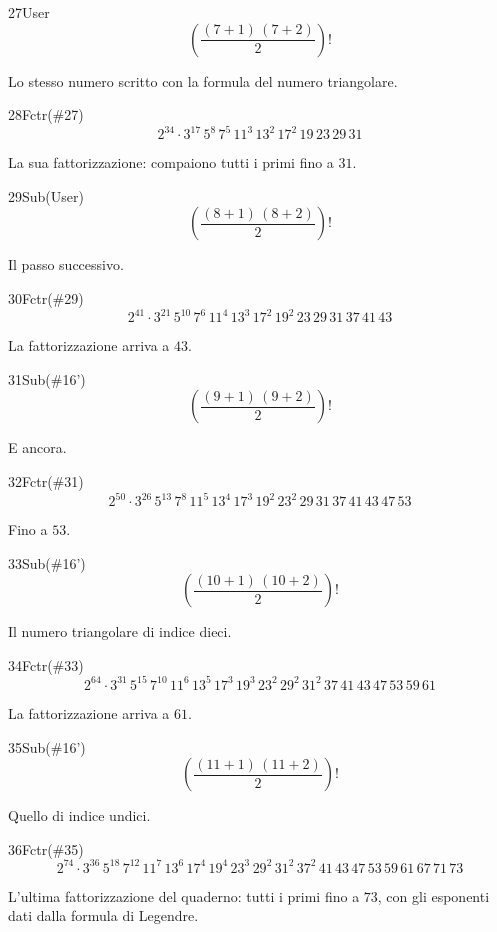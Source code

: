 \begin{espr}{27}{User}{}
\[
\left(\frac{\left(7 + 1\right)\, \left(7 + 2\right)}{2}\right)!
\]
\end{espr}
Lo stesso numero scritto con la formula del numero triangolare.

\begin{espr}{28}{Fctr(\#27)}{}
\[
2^{34} \cdot 3^{17}\, 5^{8}\, 7^{5}\, 11^{3}\, 13^{2}\, 17^{2}\, 19\, 23\, 29\, 31
\]
\end{espr}
La sua fattorizzazione: compaiono tutti i primi fino a $31$.

\begin{espr}{29}{Sub(User)}{}
\[
\left(\frac{\left(8 + 1\right)\, \left(8 + 2\right)}{2}\right)!
\]
\end{espr}
Il passo successivo.

\begin{espr}{30}{Fctr(\#29)}{}
\[
2^{41} \cdot 3^{21}\, 5^{10}\, 7^{6}\, 11^{4}\, 13^{3}\, 17^{2}\, 19^{2}\, 23\, 29\, 31\, 37\, 41\, 43
\]
\end{espr}
La fattorizzazione arriva a $43$.

\begin{espr}{31}{Sub(\#16')}{}
\[
\left(\frac{\left(9 + 1\right)\, \left(9 + 2\right)}{2}\right)!
\]
\end{espr}
E ancora.

\begin{espr}{32}{Fctr(\#31)}{}
\[
2^{50} \cdot 3^{26}\, 5^{13}\, 7^{8}\, 11^{5}\, 13^{4}\, 17^{3}\, 19^{2}\, 23^{2}\, 29\, 31\, 37\, 41\, 43\, 47\, 53
\]
\end{espr}
Fino a $53$.

\begin{espr}{33}{Sub(\#16')}{}
\[
\left(\frac{\left(10 + 1\right)\, \left(10 + 2\right)}{2}\right)!
\]
\end{espr}
Il numero triangolare di indice dieci.

\begin{espr}{34}{Fctr(\#33)}{}
\[
2^{64} \cdot 3^{31}\, 5^{15}\, 7^{10}\, 11^{6}\, 13^{5}\, 17^{3}\, 19^{3}\, 23^{2}\, 29^{2}\, 31^{2}\, 37\, 41\, 43\, 47\, 53\, 59\, 61
\]
\end{espr}
La fattorizzazione arriva a $61$.

\begin{espr}{35}{Sub(\#16')}{}
\[
\left(\frac{\left(11 + 1\right)\, \left(11 + 2\right)}{2}\right)!
\]
\end{espr}
Quello di indice undici.

\begin{espr}{36}{Fctr(\#35)}{}
\[
2^{74} \cdot 3^{36}\, 5^{18}\, 7^{12}\, 11^{7}\, 13^{6}\, 17^{4}\, 19^{4}\, 23^{3}\, 29^{2}\, 31^{2}\, 37^{2}\, 41\, 43\, 47\, 53\, 59\, 61\, 67\, 71\, 73
\]
\end{espr}
L'ultima fattorizzazione del quaderno: tutti i primi fino a $73$, con gli esponenti dati dalla formula di Legendre.



